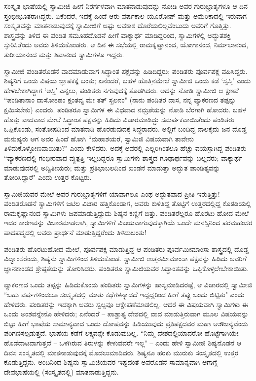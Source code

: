ಸಂಸ್ಕೃತ ಭಾಷೆಯಲ್ಲಿ ಸ್ವಾಮೀಜಿ ಹೀಗೆ ನಿರರ್ಗಳವಾಗಿ ಮಾತನಾಡುವುದನ್ನು ನೋಡಿ ಅವರ ಗುರುಭ್ರಾತೃಗಳೂ ಆ ದಿನ ಸ್ತಂಭೀಭೂತರಾಗಿದ್ದರು. ಏಕೆಂದರೆ, ಇದಕ್ಕೆ ಹಿಂದೆ ಆರು ವರ್ಷಕಾಲ ಯೂರೋಪ್ ಮತ್ತು ಅಮೆರಿಕಾದಲ್ಲಿ ಇರುವಾಗ ಸಂಸ್ಕೃತವನ್ನು ಮಾತನಾಡುವುದಕ್ಕೆ ಸ್ವಾಮೀಜಿಗೆ ಅಷ್ಟು ಅವಕಾಶ ದೊರೆಯಲಿಲ್ಲವೆಂಬುದು ಅವರಿಗೆ ಗೊತ್ತಿತ್ತು. ಶಾಸ್ತ್ರವನ್ನು ತಿಳಿದ ಈ ಪಂಡಿತ ಸಮೂಹದೊಡನೆ ಹೀಗೆ ವಾಕ್ಯಾರ್ಥ ಮಾಡಿದ್ದರಿಂದ, ಸ್ವಾಮಿಗಳಲ್ಲಿ ಅದ್ಭುತಶಕ್ತಿ ಸ್ಫುರಿಸಿತ್ತೆಂದು ಅವರು ತಿಳಿದುಕೊಂಡರು. ಆ ದಿನ ಈ ಸಭೆಯಲ್ಲಿ ರಾಮಕೃಷ್ಣಾನಂದ, ಯೋಗಾನಂದ, ನಿರ್ಮಲಾನಂದ, ತುರೀಯಾನಂದ ಮತ್ತು ಶಿವಾನಂದ ಸ್ವಾಮಿಗಳೂ ಇದ್ದರು.

ಸ್ವಾಮೀಜಿ ಪಂಡಿತರೊಡನೆ ವಾದಮಾಡುವಾಗ ಸಿದ್ಧಾಂತ ಪಕ್ಷವನ್ನು ಹಿಡಿದಿದ್ದರು; ಪಂಡಿತರು ಪೂರ್ವಪಕ್ಷ ವಹಿಸಿದ್ದರು. ಶಿಷ್ಯನಿಗೆ ಒಂದು ವಿಷಯ ಜ್ಞಾಪಕಕ್ಕೆ ಬಂತು; ಏನೆಂದರೆ, ಬಹಳ ಹೊತ್ತಿನಮೇಲೆ ಸ್ವಾಮೀಜಿ ಒಂದು ಕಡೆ ‘ಸ್ವಸ್ತಿ’ ಎಂದು ಹೇಳಬೇಕಾಗಿದ್ದಾಗ ‘ಅಸ್ತಿ’ ಎನ್ನಲು, ಪಂಡಿತರು ನಗುವುದಕ್ಕೆ ತೊಡಗಿದರು. ಅದನ್ನು ನೋಡಿ ಸ್ವಾಮೀಜಿ ಆ ಕ್ಷಣವೆ “ಪಂಡಿತಾನಾಂ ದಾಸೋಽಹಂ ಕ್ಷಂತವ್ಯ ಮೇ ತತ್ ಸ್ಖಲನಂ" (ನಾನು ಪಂಡಿತರ ದಾಸ, ನನ್ನ ವ್ಯಾಕರಣದ ತಪ್ಪನ್ನು ಕ್ಷಮಿಸಬೇಕು) ಎಂದರು. ಪಂಡಿತರೂ ಸ್ವಾಮಿಗಳ ಈ ವಿಧವಾದ ನಮ್ರತೆಯನ್ನು ನೋಡಿ ಬೆರಗಾಗಿ ಹೋದರು. ಬಹಳ ಹೊತ್ತು ವಾದವಾದ ಮೇಲೆ ಸಿದ್ಧಾಂತ ಪಕ್ಷವನ್ನು ಹಿಡಿದು ವಿಚಾರಮಾಡಿದ್ದು ಸಮರ್ಪಕವಾಯಿತೆಂದು ಪಂಡಿತರು ಒಪ್ಪಿಕೊಂಡು, ಸಂತೋಷದಿಂದ ಮಾತನಾಡಿ ಹೊರಡುವುದಕ್ಕೆ ಸಿದ್ಧರಾದರು. ಅಲ್ಲಿಗೆ ಬಂದಿದ್ದ ನಾಲಕೈದು ಜನ ದೊಡ್ಡ ಮನುಷ್ಯರು ಆಗ ಅವರ ಹಿಂದೆ ಹೋಗಿ “ಮಹಾಶಯರೆ, ಸ್ವಾಮಿಜಿ ವಿಷಯವಾಗಿ ತಾವೇನು ತಿಳಿದುಕೊಳ್ಳೋಣವಾಯಿತು?" ಎಂದು ಕೇಳಿದರು. ಅದಕ್ಕೆ ಅವರಲ್ಲಿ ಎಲ್ಲರಿಗಿಂತಲೂ ಹೆಚ್ಚು ವಯಸ್ಸಾಗಿದ್ದ ಪಂಡಿತರು “ವ್ಯಾಕರಣದಲ್ಲಿ ಗಂಭೀರವಾದ ವ್ಯುತ್ಪತ್ತಿ ಇಲ್ಲದಿದ್ದರೂ ಸ್ವಾಮಿಗಳು ಶಾಸ್ತ್ರದ ಗೂಢಾರ್ಥವನ್ನು ಬಲ್ಲವರು; ವಾಕ್ಯಾರ್ಥ ಮಾಡುವುದರಲ್ಲಿ ಅದ್ವಿತೀಯರು; ಮತ್ತು ಪ್ರತಿಭಾಬಲದಿಂದ ಖಂಡನೆ ಮಾಡುತ್ತಾ ಅದ್ಭುತ ಪಾಂಡಿತ್ಯವನ್ನು ತೋರಿಸಿದ್ದಾರೆ" ಎಂದು ಉತ್ತರ ಕೊಟ್ಟರು.

ಸ್ವಾಮಿಜಿಯವರ ಮೇಲೆ ಅವರ ಗುರುಭ್ರಾತೃಗಳಿಗೆ ಯಾವಾಗಲೂ ಎಂಥ ಅದ್ಭುತವಾದ ಪ್ರೀತಿ ಇರುತ್ತಿತ್ತು! ಪಂಡಿತರೊಡನೆ ಸ್ವಾಮಿಗಳಿಗೆ ಜಟಿಲ ವಿಚಾರ ಹತ್ತಿಕೊಂಡಾಗ, ಅವರು ಕುಳಿತಿದ್ದ ತೊಟ್ಟಿಗೆ ಉತ್ತರದಲ್ಲಿದ್ದ ಕೊಠಡಿಯಲ್ಲಿ ರಾಮಕೃಷ್ಣಾನಂದ ಸ್ವಾಮಿಗಳು ಜಪಮಾಡುತ್ತಿದ್ದುದು ಶಿಷ್ಯನ ಕಣ್ಣಿಗೆ ಬಿತ್ತು. ಪಂಡಿತರೆಲ್ಲರೂ ಹೊರಟು ಹೋದ ಮೇಲೆ ಇದರ ಕಾರಣವನ್ನು ವಿಚಾರಮಾಡಲಾಗಿ, ಸ್ವಾಮಿಗಳಿಗೆ ವಿಜಯವಾಗುವುದಕ್ಕಾಗಿಯೆ ಒಂದೇ ಮನಸ್ಸಿನಿಂದ ಪರಮಹಂಸರ ಪಾದಪದ್ಮದಲ್ಲಿ ಅವರು ಪ್ರಾರ್ಥನೆ ಮಾಡುತ್ತಿದ್ದರೆಂದು ತಿಳಿದುಬಂತು!

ಪಂಡಿತರು ಹೊರಟುಹೋದ ಮೇಲೆ, ಪೂರ್ವಪಕ್ಷ ಮಾಡುತ್ತಿದ್ದ ಆ ಪಂಡಿತರು ಪೂರ್ವಮೀಮಾಂಸಾ ಶಾಸ್ತ್ರದಲ್ಲಿ ದೊಡ್ಡ ವಿದ್ವಾಂಸರೆಂದು, ಶಿಷ್ಯನು ಸ್ವಾಮಿಗಳಿಂದ ತಿಳಿದುಕೊಂಡ. ಸ್ವಾಮೀಜಿ ಉತ್ತರಮೀಮಾಂಸಾ ಪಕ್ಷವನ್ನು ಹಿಡಿದು ಅವರಿಗೆ ಜ್ಞಾನಕಾಂಡದ ಶ್ರೇಷ್ಠತೆಯನ್ನು ತೋರಿಸಿದರು. ಪಂಡಿತರೂ ಸ್ವಾಮಿಜಿಯವರ ಸಿದ್ಧಾಂತವನ್ನು ಒಪ್ಪಿಕೊಳ್ಳಲೇಬೇಕಾಯಿತು.

ವ್ಯಾಕರಣದ ಒಂದು ತಪ್ಪನ್ನು ಹಿಡಿದುಕೊಂಡು ಪಂಡಿತರು ಸ್ವಾಮಿಗಳನ್ನು ಹಾಸ್ಯಮಾಡಿದರಷ್ಟೆ, ಆ ವಿಚಾರದಲ್ಲಿ ಸ್ವಾಮೀಜಿ “ಬಹು ವರ್ಷಗಳಿಂದಲೂ ಸಂಸ್ಕೃತದಲ್ಲಿ ಮಾತು ಕಥೆಗಳನ್ನಾಡದೆ ಇದ್ದದ್ದರಿಂದ ಹೀಗೆ ತಪ್ಪು ಬಂದು ಬಿಟ್ಟಿತು" ಎಂದು ಹೇಳಿದರು. ಪಂಡಿತರನ್ನು ಇದಕ್ಕಾಗಿ ಅವರು ಸ್ವಲ್ಪವೂ ಆಕ್ಷೇಪಣೆಮಾಡಲಿಲ್ಲ. ಆದರೆ ಈ ವಿಷಯವಾಗಿ ಸ್ವಾಮಿಗಳು ಈ ಒಂದು ಅಂಶವನ್ನೇನೊ ಹೇಳಿದರು; ಏನೆಂದರೆ – ಪಾಶ್ಚಾತ್ಯ ದೇಶದಲ್ಲಿ ವಾದ ಮಾಡುತ್ತಿರುವಾಗ ಮೂಲ ವಿಷಯವನ್ನು ಬಿಟ್ಟು ಹೀಗೆ ಭಾಷೆಯ ಸಾಮಾನ್ಯವಾದ ಒಂದು ದೋಷವನ್ನು ಹಿಡಿಯುವುದು ಪ್ರತಿಪಕ್ಷದವರ ಮಹಾ ಅಸೌಜನ್ಯವೆಂದು ಪರಿಗಣಿಸಲ್ಪಡುತ್ತದೆ. ಭಾಷೆಯ ಕಡೆಗೆ ಲಕ್ಷ್ಯವನ್ನೇ ಕೊಡುವುದಿಲ್ಲ. “ನಿಮ್ಮ ದೇಶದಲ್ಲಿಯಾದರೋ ಹೊಟ್ಟೆಗಾಗಿಯೇ ಹೊಡೆದಾಟವಾಗುತ್ತದೆ – ಒಳಗಿರುವ ತಿರುಳನ್ನು ಕೇಳುವವರೇ ಇಲ್ಲ" – ಎಂದು ಹೇಳಿ ಸ್ವಾಮೀಜಿ ಶಿಷ್ಯನೊಡನೆ ಆ ದಿವಸ ಸಂಸ್ಕೃತದಲ್ಲಿ ಮಾತನಾಡುವುದಕ್ಕೆ ಮೊದಲುಮಾಡಿದರು. ಶಿಷ್ಯನೂ ಹರಕು ಮುರುಕು ಸಂಸ್ಕೃತದಲ್ಲಿ ಉತ್ತರ ಕೊಡುತ್ತಿದ್ದನು. ಅಂದಿನಿಂದ ಶಿಷ್ಯನು ಸ್ವಾಮಿಜಿಯವರ ಇಷ್ಟದಂತೆ ಅವರೊಡನೆ ಸಾಮಾನ್ಯವಾಗಿ ಆಗಾಗ್ಗೆ ದೇವಭಾಷೆಯಲ್ಲಿ (ಸಂಸ್ಕೃತದಲ್ಲಿ) ಮಾತನಾಡುತ್ತಿದ್ದನು.

